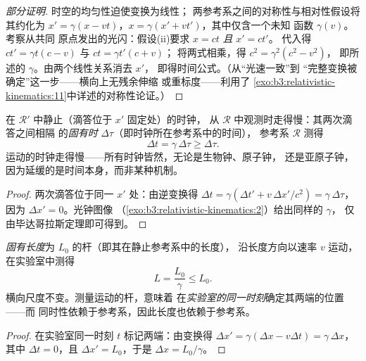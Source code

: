 \begin{proof}[部分证明]
时空的均匀性迫使变换为线性；
两参考系之间的对称性与相对性假设将其约化为
$x' = \gamma(x - vt)$，$x = \gamma(x' + vt')$，其中仅含一个未知
函数 $\gamma(v)$。考察从共同
原点发出的光闪：假设(ii)要求 $x = ct$ \emph{且} $x' = ct'$。
代入得 $ct' = \gamma t(c - v)$ 与 $ct = \gamma t'(c + v)$；
将两式相乘，得 $c^2 = \gamma^2(c^2 - v^2)$，
即所述的 $\gamma$。由两个线性关系消去 $x'$，
即得时间公式。（从“光速一致”到
“完整变换被确定”这一步——横向上无残余伸缩
或重标度——利用了
\cref{exo:b3:relativistic-kinematics:11}中详述的对称性论证。）
\end{proof}

\begin{proposition}[时间延缓]\label{prop:b3:relativistic-kinematics:dilation}
在 $\mathcal R'$ 中静止（滴答位于 $x'$ 固定处）的时钟，
从 $\mathcal R$ 中观测时走得慢：其两次滴答之间相隔
的\emph{固有时} $\Delta\tau$（即时钟所在参考系中的时间），
参考系 $\mathcal R$ 测得
\[
\Delta t = \gamma\,\Delta\tau \ge \Delta\tau .
\]
运动的时钟走得慢——所有时钟皆然，无论是生物钟、原子钟，
还是亚原子钟，因为延缓的是时间本身，而非某种机制。
\end{proposition}

\begin{proof}
两次滴答位于同一 $x'$ 处：由逆变换得 $\Delta t
= \gamma(\Delta t' + v\,\Delta x'/c^2) = \gamma\,\Delta\tau$，因为
$\Delta x' = 0$。光钟图像
（\cref{exo:b3:relativistic-kinematics:2}）给出同样的 $\gamma$，
仅由毕达哥拉斯定理即可得到。
\end{proof}

\begin{proposition}[长度收缩]\label{prop:b3:relativistic-kinematics:contraction}
\emph{固有长度}为 $L_0$ 的杆（即其在静止参考系中的长度），
沿长度方向以速率 $v$ 运动，在实验室中测得
\[
L = \frac{L_0}{\gamma} \le L_0 .
\]
横向尺度不变。测量运动的杆，意味着
在\emph{实验室的同一时刻}确定其两端的位置——而
同时性依赖于参考系，因此长度也依赖于参考系。
\end{proposition}

\begin{proof}
在实验室同一时刻 $t$ 标记两端：由变换得
$\Delta x' = \gamma(\Delta x - v\Delta t) = \gamma\,\Delta x$，其中
$\Delta t = 0$，且 $\Delta x' = L_0$，于是 $\Delta x = L_0/\gamma$。
\end{proof}

